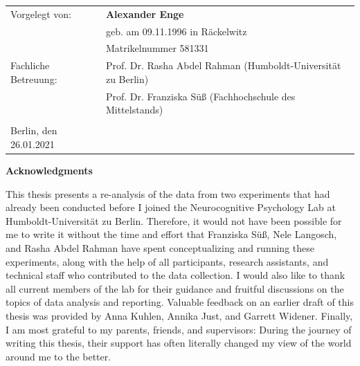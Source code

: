\documentclass[
  english,
  doc,12pt,twoside,floatsintext]{apa7}
\begin{document}
\begin{flushleft}
{
\begin{tabular}{ll}
Vorgelegt von:&\textbf{Alexander Enge}\\
&geb. am 09.11.1996 in Räckelwitz\\
&Matrikelnummer 581331\\
Fachliche Betreuung:&Prof. Dr. Rasha Abdel Rahman (Humboldt-Universität zu Berlin)\\
&Prof. Dr. Franziska Süß (Fachhochschule des Mittelstands)\\
&\\
Berlin, den 26.01.2021&\\
\end{tabular}
}
\end{flushleft}

\clearpage

\mbox{}\thispagestyle{empty}\clearpage

\thispagestyle{empty}

\vspace*{55mm}

\begin{center}\textbf{Acknowledgments}\end{center}

This thesis presents a re-analysis of the data from two experiments that had already been conducted before I joined the Neurocognitive Psychology Lab at Humboldt-Universität zu Berlin. Therefore, it would not have been possible for me to write it without the time and effort that Franziska Süß, Nele Langosch, and Rasha Abdel Rahman have spent conceptualizing and running these experiments, along with the help of all participants, research assistants, and technical staff who contributed to the data collection. I would also like to thank all current members of the lab for their guidance and fruitful discussions on the topics of data analysis and reporting. Valuable feedback on an earlier draft of this thesis was provided by Anna Kuhlen, Annika Just, and Garrett Widener. Finally, I am most grateful to my parents, friends, and supervisors: During the journey of writing this thesis, their support has often literally changed my view of the world around me to the better.

\clearpage

\mbox{}\thispagestyle{empty}\clearpage

\thispagestyle{empty}

\vspace*{45mm}
\end{document}
